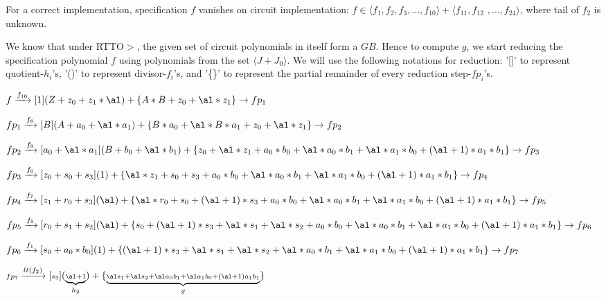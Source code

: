 \begin{Example}
For a correct implementation, specification $f$ vanishes on circuit implementation:
$f \in \langle f_1,f_2,f_3,\dots,f_{10}\rangle+\langle f_{11},f_{12}$ $,\dots,f_{24}\rangle$,
 where tail of $f_2$ is unknown.

We know that under RTTO$>$, the given set of circuit polynomials in itself form a $GB$. Hence to compute $g$, we start reducing the specification polynomial $f$ using polynomials from the set $\langle J + J_0\rangle$. We will use the following notations for reduction: '[]' to represent quotient-$h_i$'s, '()' to represent divisor-$f_i$'s, and '\{\}' to represent the partial remainder of every reduction step-$fp_i$'s.

\begin{small}
$f\xrightarrow[]{f_{10}}[1](Z + z_0 + z_1*\al)+\{ A*B+z_0+\al*z_1\}\rightarrow fp_1$

$fp_1\xrightarrow[]{f_8}[B](A+a_0+\al*a_1)+\{B*a_0+\al*B*a_1+z_0+\al*z_1\}\rightarrow fp_2$

$fp_2\xrightarrow[]{f_9}[a_0+\al*a_1](B+b_0+\al*b_1)+\{z_0+\al*z_1+a_0*b_0+\al*a_0*b_1+\al*a_1*b_0+(\al+1)*a_1*b_1\}\rightarrow fp_3$

$fp_3\xrightarrow[]{f_6}[z_0+s_0+s_3](1)+\{\al*z_1+s_0+s_3+a_0*b_0+\al*a_0*b_1+\al*a_1*b_0+(\al+1)*a_1*b_1\}\rightarrow fp_4$

$fp_4\xrightarrow[]{f_7}[z_1+r_0+s_3](\al)+\{\al*r_0+s_0+(\al+1)*s_3+a_0*b_0+\al*a_0*b_1+\al*a_1*b_0+(\al+1)*a_1*b_1\}\rightarrow fp_5$

$fp_5\xrightarrow[]{f_5}[r_0+s_1+s_2](\al)+\{s_0+(\al+1)*s_3+\al*s_1+\al*s_2+a_0*b_0+\al*a_0*b_1+\al*a_1*b_0+(\al+1)*a_1*b_1\}\rightarrow fp_6$

$fp_6\xrightarrow[]{f_1}[s_0+a_0*b_0](1)+\{(\al+1)*s_3+\al*s_1+\al*s_2+\al*a_0*b_1+\al*a_1*b_0+(\al+1)*a_1*b_1\}\rightarrow fp_7$

${\scriptstyle fp_7}\xrightarrow[]{{\scriptstyle lt(f_2)}}[{\scriptstyle s_3}](\underbrace{{\scriptstyle \al+1}}_\text{$h_2$})+\{\underbrace{{\scriptstyle\al s_1+\al s_2+\al a_0b_1+\al a_1b_0+(\al+1)a_1b_1}}_\text{$g$}\}$



\end{small}
\end{Example}
